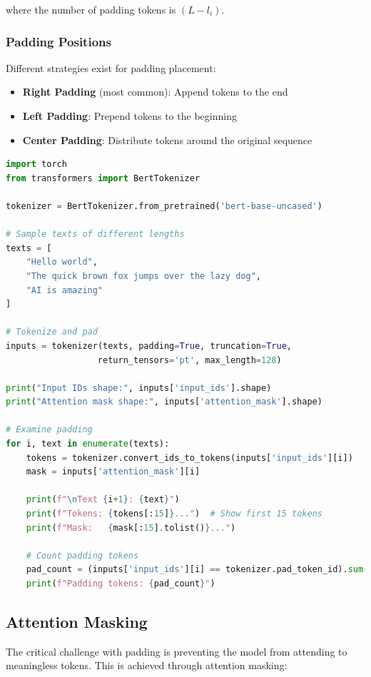 where the number of padding tokens is $(L - l_i)$.

\subsubsection{Padding Positions}
Different strategies exist for padding placement:

\begin{itemize}
\item \textbf{Right Padding} (most common): Append \pad{} tokens to the end
\item \textbf{Left Padding}: Prepend \pad{} tokens to the beginning  
\item \textbf{Center Padding}: Distribute \pad{} tokens around the original sequence
\end{itemize}

\begin{lstlisting}[language=Python, caption=Padding Implementation]
import torch
from transformers import BertTokenizer

tokenizer = BertTokenizer.from_pretrained('bert-base-uncased')

# Sample texts of different lengths
texts = [
    "Hello world",
    "The quick brown fox jumps over the lazy dog",
    "AI is amazing"
]

# Tokenize and pad
inputs = tokenizer(texts, padding=True, truncation=True, 
                  return_tensors='pt', max_length=128)

print("Input IDs shape:", inputs['input_ids'].shape)
print("Attention mask shape:", inputs['attention_mask'].shape)

# Examine padding
for i, text in enumerate(texts):
    tokens = tokenizer.convert_ids_to_tokens(inputs['input_ids'][i])
    mask = inputs['attention_mask'][i]
    
    print(f"\nText {i+1}: {text}")
    print(f"Tokens: {tokens[:15]}...")  # Show first 15 tokens
    print(f"Mask:   {mask[:15].tolist()}...")
    
    # Count padding tokens
    pad_count = (inputs['input_ids'][i] == tokenizer.pad_token_id).sum()
    print(f"Padding tokens: {pad_count}")
\end{lstlisting}

\subsection{Attention Masking}

The critical challenge with padding is preventing the model from attending to meaningless \pad{} tokens. This is achieved through attention masking:

